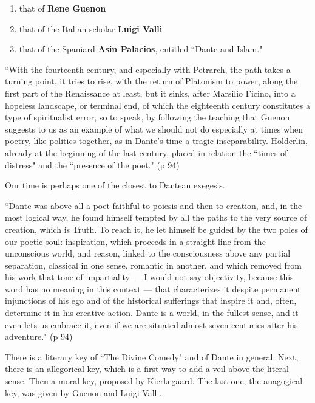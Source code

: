 \begin{enumerate}
\item that of \textbf{Rene Guenon} 
\item that of the Italian scholar \textbf{Luigi Valli} 
\item that of the Spaniard \textbf{Asin Palacios}, entitled ``Dante and Islam." 
\end{enumerate}
\begin{quotex}
``With the fourteenth century, and especially with Petrarch, the path takes a turning point, it tries to rise, with the return of Platonism to power, along the first part of the Renaissance at least, but it sinks, after Marsilio Ficino, into a hopeless landscape, or terminal end, of which the eighteenth century constitutes a type of spiritualist error, so to speak, by following the teaching that Guenon suggests to us as an example of what we should not do especially at times when poetry, like politics together, as in Dante's time a tragic inseparability. Hölderlin, already at the beginning of the last century, placed in relation the ``times of distress" and the ``presence of the poet." (p 94) 

\end{quotex}
Our time is perhaps one of the closest to Dantean exegesis.

\begin{quotex}
``Dante was above all a poet faithful to poiesis and then to creation, and, in the most logical way, he found himself tempted by all the paths to the very source of creation, which is Truth. To reach it, he let himself be guided by the two poles of our poetic soul: inspiration, which proceeds in a straight line from the unconscious world, and reason, linked to the consciousness above any partial separation, classical in one sense, romantic in another, and which removed from his work that tone of impartiality — I would not say objectivity, because this word has no meaning in this context — that characterizes it despite permanent injunctions of his ego and of the historical sufferings that inspire it and, often, determine it in his creative action. Dante is a world, in the fullest sense, and it even lets us embrace it, even if we are situated almost seven centuries after his adventure." (p 94) 

\end{quotex}
There is a literary key of ``The Divine Comedy" and of Dante in general. Next, there is an allegorical key, which is a first way to add a veil above the literal sense. Then a moral key, proposed by Kierkegaard. The last one, the anagogical key, was given by Guenon and Luigi Valli.

